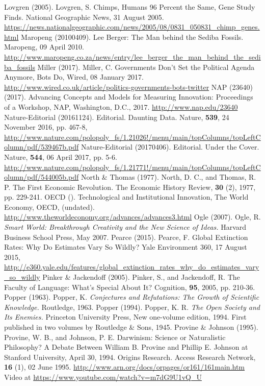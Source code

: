 \begin{multicols}{2}
\begin{thebibliography}{99}
 Lovgren (2005). Lovgren, S. Chimps, Humans 96 Percent the Same, Gene Study Finds. National Geographic News, 31 August 2005. \url{https://news.nationalgeographic.com/news/2005/08/0831_050831_chimp_genes.html}
 Maropeng (20100409). Lee Berger: The Man behind the Sediba Fossils. Maropeng, 09 April 2010. \url{http://www.maropeng.co.za/news/entry/lee_berger_the_man_behind_the_sediba_fossils}
 Miller (2017). Miller, C. Governments Don't Set the Political Agenda Anymore, Bots Do, Wired, 08 January 2017. \url{http://www.wired.co.uk/article/politics-governments-bots-twitter}
 NAP (23640) (2017). Advancing Concepts and Models for Measuring Innovation: Proceedings of a Workshop, NAP, Washington, D.C., 2017. \url{http://www.nap.edu/23640}
 Nature-Editorial (20161124). Editorial. Daunting Data. Nature, \textbf{539}, 24 November 2016, pp. 467-8, \url{http://www.nature.com/polopoly_fs/1.21026!/menu/main/topColumns/topLeftColumn/pdf/539467b.pdf}
 Nature-Editorial (20170406). Editorial. Under the Cover. Nature, \textbf{544}, 06 April 2017, pp. 5-6. \url{http://www.nature.com/polopoly_fs/1.21771!/menu/main/topColumns/topLeftColumn/pdf/544005b.pdf}
 North \& Thomas (1977). North, D. C., and Thomas, R. P. The First Economic Revolution. The Economic History Review, \textbf{30} (2), 1977, pp. 229-241.
 OECD (). Technological and Institutional Innovation, The World Economy, OECD, (undated). \url{http://www.theworldeconomy.org/advances/advances3.html}
 Ogle (2007). Ogle, R. \textit{Smart World: Breakthrough Creativity and the New Science of Ideas.} Harvard Business School Press, May 2007.
 Pearce (2015). Pearce, F. Global Extinction Rates: Why Do Estimates Vary So Wildly? Yale Environment 360, 17 August 2015, \url{http://e360.yale.edu/features/global_extinction_rates_why_do_estimates_vary_so_wildly}
 Pinker \& Jackendoff (2005). Pinker, S., and Jackendoff, R. The Faculty of Language: What’s Special About It? Cognition, \textbf{95}, 2005, pp. 210-36.
 Popper (1963). Popper, K. \textit{Conjectures and Refutations: The Growth of Scientific Knowledge.} Routledge, 1963.
 Popper (1994). Popper, K. R. \textit{The Open Society and Its Enemies.} Princeton University Press, New one-volume edition, 1994. First published in two volumes by Routledge \& Sons, 1945.
 Provine \& Johnson (1995). Provine, W. B., and Johnson, P. E. Darwinism: Science or Naturalistic Philosophy? A Debate Between William B. Provine and Phillip E. Johnson at Stanford University, April 30, 1994. Origins Research. Access Research Network, \textbf{16} (1), 02 June 1995. \url{http://www.arn.org/docs/orpages/or161/161main.htm} Video at \url{https://www.youtube.com/watch?v=m7dG9U1vQ_U}

\end{thebibliography}
\end{multicols}
